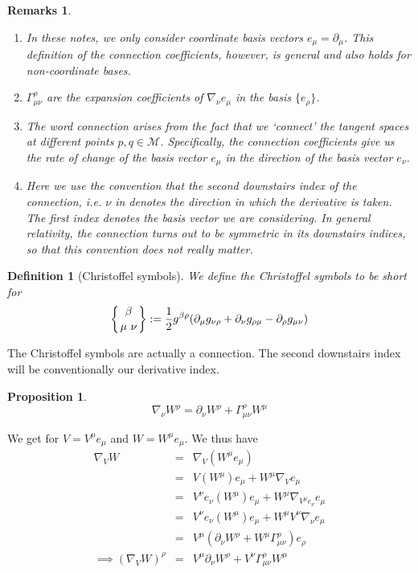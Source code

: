 \documentclass[a4paper]{article}
\newtheorem{remarks}{Remarks}[section]
\theoremstyle{new}
\newtheorem{defi}{Definition}[section]
\newtheorem{prop}{Proposition}[section]
\begin{document}
\begin{remarks}\leavevmode
\begin{enumerate}
    \item In these notes, we only consider coordinate basis vectors $e_\mu = \partial_\mu$. This definition of the connection coefficients, however, is general and also holds for non-coordinate bases.
    \item $\Gamma_{\mu\nu}^\rho$ are the expansion coefficients of $\nabla_\nu e_\mu$ in the basis $\{e_\rho\}$.
    \item The word connection arises from the fact that we `connect' the tangent spaces at different points $p,q\in\mathcal{M}$. Specifically, the connection coefficients give us the rate of change of the basis vector $e_\mu$ in the direction of the basis vector $e_\nu$.
    \item Here we use the convention that the second downstairs index of the connection, i.e. $\nu$ in denotes the direction in which the derivative is taken. The first index denotes the basis vector we are considering. In general relativity, the connection turns out to be symmetric in its downstairs indices, so that this convention does not really matter.
\end{enumerate}
\end{remarks}
\begin{defi}[Christoffel symbols]
We define the Christoffel symbols to be short for
$$\left \{ {\beta \atop
\mu\ \nu}\right \}:=\frac{1}{2}g^{\beta\rho}(\partial_\mu g_{\nu\rho}+\partial_\nu g_{\rho\mu}-\partial_\rho g_{\mu\nu})$$
\end{defi}
The Christoffel symbols are actually a connection. The second downstairs index will be conventionally our derivative index.
\begin{prop}
$$\nabla_\nu W^\rho=\partial_\nu W^\rho+\Gamma_{\mu\nu}^\rho W^\mu$$
\end{prop}
We get for $V=V^\mu e_\mu$ and $W=W^\mu e_\mu$. We thus have
\begin{eqnarray}
\nabla_VW&=&\nabla_V(W^\mu e_\mu)\nonumber\\&=&V(W^\mu)e_\mu+W^\mu\nabla_Ve_\mu\nonumber\\&=&V^\nu e_\nu(W^\mu)e_\mu+W^\mu\nabla_{V^\mu e_\nu}e_\mu\nonumber\\&=&V^\nu e_\nu(W^\mu)e_\mu+W^\mu V^\nu\nabla_{\nu}e_\mu\nonumber\\&=&V^\mu(\partial_\nu W^\rho+W^\mu\Gamma_{\mu\nu}^\rho)e_\rho\nonumber\\\implies(\nabla_VW)^\rho&=&V^\mu\partial_\nu W^\rho+V^\nu\Gamma_{\mu\nu}^\rho W^\mu\nonumber
\end{eqnarray}
\end{document}
